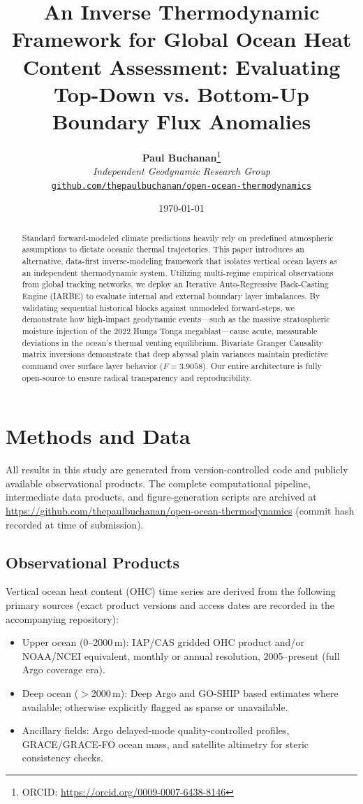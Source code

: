 \documentclass[11pt,a4paper]{article}
\title{\textbf{An Inverse Thermodynamic Framework for Global Ocean Heat Content Assessment: Evaluating Top-Down vs. Bottom-Up Boundary Flux Anomalies}}
\author{%
\textbf{Paul Buchanan}\thanks{ORCID: \url{https://orcid.org/0009-0007-6438-8146}} \\
\textit{Independent Geodynamic Research Group} \\
\texttt{\href{https://github.com/thepaulbuchanan/open-ocean-thermodynamics}{github.com/thepaulbuchanan/open-ocean-thermodynamics}}
}
\date{\today}
\begin{document}
\maketitle

\begin{abstract}
Standard forward-modeled climate predictions heavily rely on predefined atmospheric assumptions to dictate oceanic thermal trajectories. This paper introduces an alternative, data-first inverse-modeling framework that isolates vertical ocean layers as an independent thermodynamic system. Utilizing multi-regime empirical observations from global tracking networks, we deploy an Iterative Auto-Regressive Back-Casting Engine (IARBE) to evaluate internal and external boundary layer imbalances. By validating sequential historical blocks against unmodeled forward-steps, we demonstrate how high-impact geodynamic events---such as the massive stratospheric moisture injection of the 2022 Hunga Tonga megablast---cause acute, measurable deviations in the ocean's thermal venting equilibrium. Bivariate Granger Causality matrix inversions demonstrate that deep abyssal plain variances maintain predictive command over surface layer behavior ($F = 3.9058$). Our entire architecture is fully open-source to ensure radical transparency and reproducibility.
\end{abstract}
\section{Methods and Data}
\label{sec:methods}

All results in this study are generated from version-controlled code and publicly available observational products. The complete computational pipeline, intermediate data products, and figure-generation scripts are archived at \url{https://github.com/thepaulbuchanan/open-ocean-thermodynamics} (commit hash recorded at time of submission).

\subsection{Observational Products}
Vertical ocean heat content (OHC) time series are derived from the following primary sources (exact product versions and access dates are recorded in the accompanying repository):

\begin{itemize}
    \item Upper ocean (0--2000\,m): IAP/CAS gridded OHC product \citep{cheng2024} and/or NOAA/NCEI equivalent, monthly or annual resolution, 2005--present (full Argo coverage era).
    \item Deep ocean ($>$2000\,m): Deep Argo and GO-SHIP based estimates where available; otherwise explicitly flagged as sparse or unavailable.
    \item Ancillary fields: Argo delayed-mode quality-controlled profiles, GRACE/GRACE-FO ocean mass, and satellite altimetry for steric consistency checks.
\end{itemize}
\end{document}
